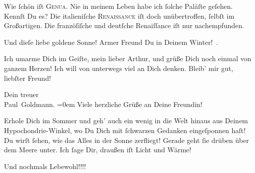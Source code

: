 \pstart
           Wie{ }ſchön iſt \textsc{Genua}. Nie in meinem Leben habe ich{ }ſolche Paläſte geſehen. Kennſt Du es? Die italieniſche \textsc{Renaissance} iſt doch unübertroffen,{ }ſelbſt im Großartigen. Die franzöſiſche und deutſche Renaiſſance iſt nur
               nachempfunden.\pend
           
\pstart
           Und dieſe liebe goldene Sonne! Armer Freund Du in Deinem Winter! .\textcolor{gray}{{\dotstwo}}\pend
           
\pstart
           Ich umarme Dich im Geiſte, mein lieber Arthur, und grüße Dich noch einmal von ganzem
                  {\pb}Herzen! Ich will von unterwegs viel an Dich
               denken. Bleib’ mir gut, liebſter Freund!\pend
           
\pstart
           Dein treuer {\\[\baselineskip]}\spacefill\mbox{Paul Goldmann.}\pend
           \leftskip=0em{}
\pstart
           \noindent{}Viele herzliche Grüße an Deine Freundin!\pend
           
\pstart
           Erhole Dich im Sommer und geh’ auch ein wenig in die Welt hinaus aus Deinem
                  Hypochondrie-Winkel, wo Du Dich mit{ }ſchwarzen Gedanken eingeſponnen haſt! Du wirſt{ }ſehen, wie das Alles in der Sonne zerfliegt! Gerade geht{ }ſie drüben über dem Meere
                  unter. Ich{ }ſage Dir, draußen iſt Licht und Wärme!\pend
           
\pstart
           Und nochmals Lebewohl!!!!\pend
           \endnumbering{}  \newcommand{\dateiname}{L02847}\newcommand{\titel}{Paul Goldmann an Arthur Schnitzler, 4. 4. 1898}\newcommand{\editorInnen}{Martin Anton Müller und Laura Untner}
